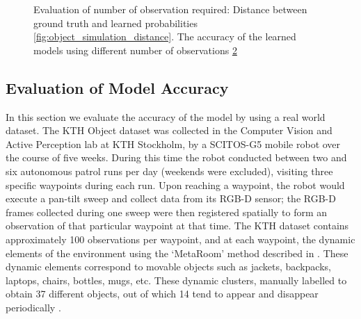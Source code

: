 \begin{figure}
\begin{subfigure}[b]{0.4\textwidth}
        \caption{}
        \label{fig:object_simulation_accuracy}
    \end{subfigure}
    \caption[Evaluation of number of observation required]{Evaluation of number of observation required: Distance between ground truth and learned probabilities \ref{fig:object_simulation_distance}. The accuracy of the learned models using different number of observations \ref{fig:object_simulation_accuracy} }\label{fig:object_simulation_accuracy}
\end{figure}

\FloatBarrier
\subsection{Evaluation of Model Accuracy}

In this section we evaluate the accuracy of the model by using a real world dataset. The KTH Object dataset was collected in the Computer Vision and Active Perception lab at KTH Stockholm, by a SCITOS-G5 mobile robot over  the  course  of  five  weeks.  During  this  time  the  robot conducted  between  two  and  six  autonomous  patrol  runs per  day  (weekends  were  excluded),  visiting  three  specific waypoints  during  each  run.  Upon  reaching  a  waypoint,  the robot  would  execute  a  pan-tilt  sweep  and  collect  data  from its RGB-D sensor; the RGB-D frames collected during one sweep were then registered spatially to form an observation of  that  particular  waypoint  at  that  time.  The  KTH  dataset contains  approximately  100 observations  per  waypoint,  and at  each  waypoint, the  dynamic  elements  of the  environment  using  the  ‘MetaRoom’  method  described in \cite{ambrucs2014meta}. These  dynamic  elements  correspond  to  movable  objects such  as  jackets,  backpacks,  laptops,  chairs,  bottles,  mugs, etc. These dynamic clusters,  manually labelled  to obtain 37 different objects, out  of  which  14  tend  to  appear  and  disappear  periodically \cite{krajnik_wheres_2015}. 


